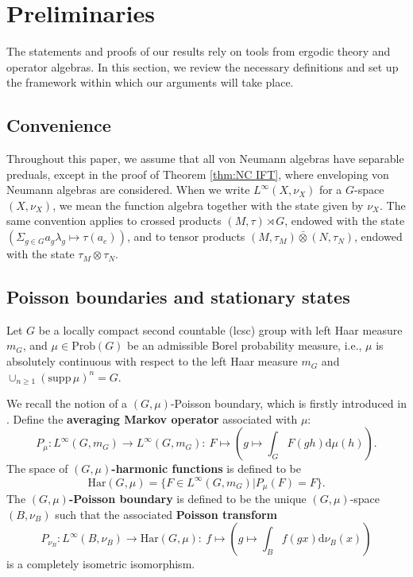 \documentclass[12pt]{amsart}
\def\d{\mathrm{d}}
\def\Prob{\mathrm{Prob}}
\theoremstyle{definition}
\begin{document}
\section{Preliminaries}\label{sec:prelinaries} The statements and proofs of our results rely on tools from ergodic theory and operator algebras. In this section, we review the necessary definitions and set up the framework within which our arguments will take place.
\subsection*{Convenience} 
Throughout this paper, we assume that all von Neumann algebras have separable preduals, except in the proof of Theorem \ref{thm:NC IFT}, where enveloping von Neumann algebras are considered. When we write $L^\infty(X,\nu_X)$ for a $G$-space $(X,\nu_X)$, we mean the function algebra together with the state given by $\nu_X$. The same convention applies to crossed products $(M,\tau)\rtimes G$, endowed with the state $(\Sigma_{g\in G} a_g\lambda_g\mapsto \tau(a_e))$, and to tensor products $(M,\tau_M)\bar{\otimes}(N,\tau_N)$, endowed with the state $\tau_M\otimes\tau_N$.



\subsection{Poisson boundaries and stationary states}\label{Preliminaries:RN factor:Poisson boundaries}
Let $G$ be a locally compact second countable (lcsc) group with left Haar measure $m_G$, and $\mu\in\Prob(G)$ be an admissible Borel probability measure, i.e., $\mu$ is absolutely continuous with respect to the left Haar measure $m_G$ and $\cup_{n\geq 1}(\mathrm{supp\,} \mu)^n=G$. 

We recall the notion of a $(G,\mu)$-Poisson boundary, which is firstly introduced in \cite{Fur63a,Fur63b}. Define the \textbf{averaging Markov operator} associated with $\mu$:
$$P_\mu: L^\infty(G,m_G)\to  L^\infty(G,m_G): \ F\mapsto \left(g\mapsto\int_G F(gh)\d \mu(h)\right).$$
The space of \textbf{$(G,\mu)$-harmonic functions} is defined to be
$$\mathrm{Har}( G ,\mu)=\{F\in  L^\infty(G,m_G)|P_\mu(F)=F\}.$$
The \textbf{$(G,\mu)$-Poisson boundary} is defined to be the unique $(G,\mu)$-space $(B,\nu_B)$ such that the associated \textbf{Poisson transform}
$$P_{\nu_B}:L^\infty(B,\nu_B)\to \mathrm{Har}( G ,\mu): \ f\mapsto\left(g\mapsto\int_B f( gx)\mathrm{d} \nu_B(x)\right)$$   
is a completely isometric isomorphism.
\end{document}
